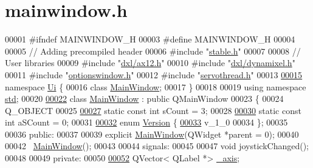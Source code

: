 \hypertarget{a00017_source}{}\section{mainwindow.\+h}

\begin{DoxyCode}
00001 \textcolor{preprocessor}{#ifndef MAINWINDOW\_H}
00003 \textcolor{preprocessor}{#define MAINWINDOW\_H}
00004 
00005 \textcolor{comment}{// Adding precompiled header}
00006 \textcolor{preprocessor}{#include "\hyperlink{a00022}{stable.h}"}
00007 
00008 \textcolor{comment}{// User libraries}
00009 \textcolor{preprocessor}{#include "\hyperlink{a00010}{dxl/ax12.h}"}
00010 \textcolor{preprocessor}{#include "\hyperlink{a00014}{dxl/dynamixel.h}"}
00011 \textcolor{preprocessor}{#include "\hyperlink{a00019}{optionswindow.h}"}
00012 \textcolor{preprocessor}{#include "\hyperlink{a00021}{servothread.h}"}
00013 
\hypertarget{a00017_source_l00015}{}\hyperlink{a00024}{00015} \textcolor{keyword}{namespace }\hyperlink{a00024}{Ui} \{
00016 \textcolor{keyword}{class }\hyperlink{a00005}{MainWindow};
00017 \}
00018 
00019 \textcolor{keyword}{using namespace }\hyperlink{a00023}{std};
00020 
\hypertarget{a00017_source_l00022}{}\hyperlink{a00005}{00022} \textcolor{keyword}{class }\hyperlink{a00005}{MainWindow} : \textcolor{keyword}{public} QMainWindow
00023 \{
00024     Q\_OBJECT
00025     
\hypertarget{a00017_source_l00027}{}\hyperlink{a00005_a646727b1c45c72638325adfd460649c0}{00027}     \textcolor{keyword}{static} \textcolor{keyword}{const} \textcolor{keywordtype}{int} sCount = 3;
00028     
\hypertarget{a00017_source_l00030}{}\hyperlink{a00005_a42c44af9c0eebc33f4e81f02e15b0461}{00030}     \textcolor{keyword}{static} \textcolor{keyword}{const} \textcolor{keywordtype}{int} aSCount = 0;
00031     
\hypertarget{a00017_source_l00032}{}\hyperlink{a00005_a355d9f17965e5105226409313743cb9d}{00032}     \textcolor{keyword}{enum} \hyperlink{a00005_a355d9f17965e5105226409313743cb9d}{Version} \{
\hypertarget{a00017_source_l00033}{}\hyperlink{a00005_a355d9f17965e5105226409313743cb9daac0c8ddcec40274ec60fb95f59ba7aba}{00033}         v\_1\_0
00034     \};
00035     
00036 \textcolor{keyword}{public}:
00037     
00039     \textcolor{keyword}{explicit} \hyperlink{a00005}{MainWindow}(QWidget *parent = 0);
00040     
00042     ~\hyperlink{a00005}{MainWindow}();
00043     
00044 signals:
00045     
00047     \textcolor{keywordtype}{void} joystickChanged();
00048 
00049 \textcolor{keyword}{private}:  
00050     
\hypertarget{a00017_source_l00052}{}\hyperlink{a00005_a30c99d7a544f74b0650758e5cc7ead5a}{00052}     QVector< QLabel *> \hyperlink{a00005_a30c99d7a544f74b0650758e5cc7ead5a}{\_axis};

\end{DoxyCode}
